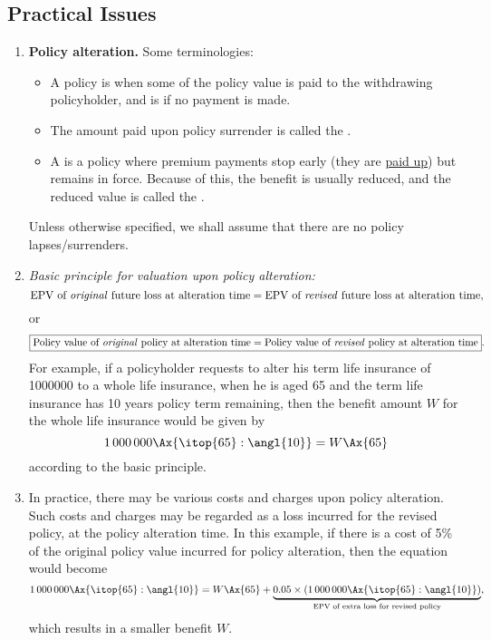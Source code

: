 \subsection{Practical Issues}
\label{subsect:practical-issues}
\begin{enumerate}
\item \textbf{Policy alteration.} Some terminologies:
\begin{itemize}
\item A policy is  when some of the policy value is paid to
the withdrawing policyholder, and is  if no payment is made.
\item The amount paid upon policy surrender is called the .
\item A  is a policy where premium payments stop early
(they are \underline{paid up}) but remains in force. Because of this, the
benefit is usually reduced, and the reduced value is called the .
\end{itemize}
\begin{note}
Unless otherwise specified, we shall assume that there are no policy
lapses/surrenders.
\end{note}

\item \label{it:value-policy-alt} \emph{Basic principle for valuation upon
policy alteration:}
\[
\text{EPV of \emph{original} future loss at alteration time}
=\text{EPV of \emph{revised} future loss at alteration time},
\]
or
\[
\boxed{\text{Policy value of \emph{original} policy at alteration time}
=\text{Policy value of \emph{revised} policy at alteration time}}.
\]
For example, if a policyholder requests to alter his term life insurance of
\num{1000000} to a whole life insurance, when he is aged 65 and the term life
insurance has 10 years policy term remaining, then the benefit amount \(W\) for
the whole life insurance would be given by
\[
\num{1000000}\Ax{\itop{65}:\angl{10}}=W\Ax{65}
\]
according to the basic principle.

\item In practice, there may be various costs and charges upon policy
alteration. Such costs and charges may be regarded as a loss incurred for the
revised policy, at the policy alteration time. In this example, if there is a
cost of 5\% of the original policy value incurred for policy alteration, then
the equation would become
\[
\num{1000000}\Ax{\itop{65}:\angl{10}}=W\Ax{65}+\underbrace{0.05\times
\qty(\num{1000000}\Ax{\itop{65}:\angl{10}})}_{\mathclap{\text{EPV of extra loss for revised policy}}},
\]
which results in a smaller benefit \(W\).


\end{enumerate}
